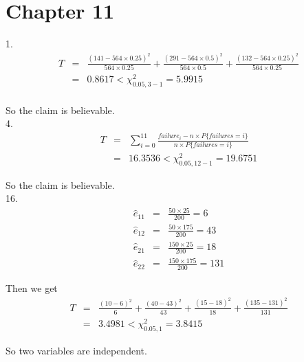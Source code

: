 \documentclass[12pt]{article}
\begin{document}
\section*{Chapter 11}

1.
\begin{eqnarray*}
  T &=& \frac {(141 - 564 \times 0.25)^2}{564 \times 0.25}
  + \frac {(291 - 564 \times 0.5)^2}{564 \times 0.5}
  + \frac {(132 - 564 \times 0.25)^2}{564 \times 0.25} \\
  &=& 0.8617 < \chi^2_{0.05, 3-1} = 5.9915 \\
\end{eqnarray*}

So the claim is believable. \\

4.
\begin{eqnarray*}
  T &=& \sum_{i=0}^{11} \frac {failure_i -  n \times P\{failures = i\}}
  {n \times P\{failures = i\}} \\
  &=& 16.3536 < \chi^2_{0.05, 12-1} = 19.6751
\end{eqnarray*}

So the claim is believable. \\

16.
\begin{eqnarray*}
  \hat{e}_{11} &=& \frac {50 \times 25}{200} = 6 \\
  \hat{e}_{12} &=& \frac {50 \times 175}{200} = 43 \\
  \hat{e}_{21} &=& \frac {150 \times 25}{200} = 18 \\
  \hat{e}_{22} &=& \frac {150 \times 175}{200} = 131
\end{eqnarray*}

Then we get
\begin{eqnarray*}
  T &=& \frac {(10 - 6)^2}{6} + \frac {(40 - 43)^2}{43}
  + \frac {(15 - 18)^2}{18} + \frac {(135 - 131)^2}{131} \\
  &=& 3.4981  < \chi^2_{0.05, 1} = 3.8415
\end{eqnarray*}

So two variables are independent.
\end{document}
